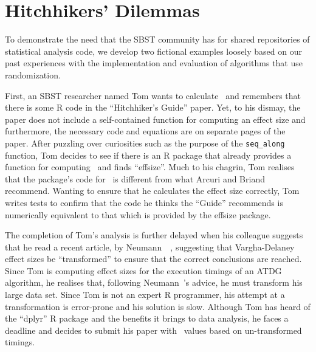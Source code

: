 
\vspace*{-1em}

\section{Hitchhikers' Dilemmas}
\label{sec:dilemma}

To demonstrate the need that the SBST community has for shared repositories of statistical analysis code, we develop two
fictional examples loosely based on our past experiences with the implementation and evaluation of algorithms that use
randomization.

First, an SBST researcher named Tom wants to calculate \atwelve~and remembers that there is some R code in the
``Hitchhiker's Guide'' paper. Yet, to his dismay, the paper does not include a self-contained function for computing an
effect size and furthermore, the necessary code and equations are on separate pages of the paper. After puzzling over
curiosities such as the purpose of the {\tt seq\_along} function, Tom decides to see if there is an R package that
already provides a function for computing \atwelve~and finds ``effsize''. Much to his chagrin, Tom realises that the
package's code for \atwelve~is different from what Arcuri and Briand recommend. Wanting to ensure that he calculates the
effect size correctly, Tom writes tests to confirm that the code he thinks the ``Guide'' recommends is numerically
equivalent to that which is provided by the effsize package.

The completion of Tom's analysis is further delayed when his colleague suggests that he read a recent article, by
Neumann~\etal~\cite{Neumann2015}, suggesting that Vargha-Delaney effect sizes be ``transformed'' to ensure that the
correct conclusions are reached. Since Tom is computing effect sizes for the execution timings of an ATDG algorithm, he
realises that, following Neumann~\etal's advice, he must transform his large data set. Since Tom is not an expert R
programmer, his attempt at a transformation is error-prone and his solution is slow. Although Tom has heard of the
``dplyr'' R package and the benefits it brings to data analysis, he faces a deadline and decides to submit his paper
with \atwelve~values based on un-transformed timings.

